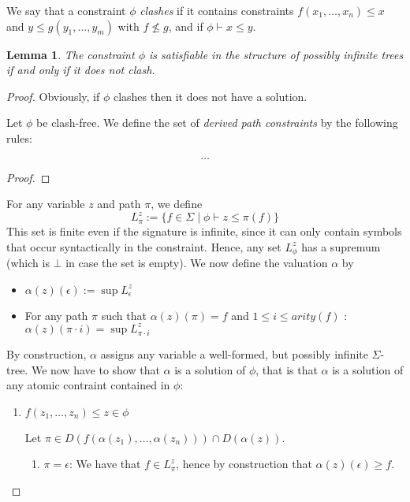\documentclass[11pt]{article}
\newtheorem{lemma}{Lemma}
\begin{document}
We say that a constraint $\phi$ \emph{clashes} if it contains
constraints $f(x_1,\ldots,x_n) \leq x$ and $y \leq g(y_1,\ldots,y_m)$
with $f \not\leq g$, and if $\phi \vdash x \leq y$.

\begin{lemma}
  The constraint $\phi$ is satisfiable in the structure of possibly
  infinite trees if and only if it does not clash.
\end{lemma}

\begin{proof}
  Obviously, if $\phi$ clashes then it does not have a solution.
  
  Let $\phi$ be clash-free. We define the set of \emph{derived path
    constraints} by the following rules:

\[\ldots \]

\begin{proof}

\end{proof}

For any variable $z$ and path $\pi$, we define 
\[
L^z_\pi  := \{f \in \Sigma \mid \phi \vdash z \leq \pi(f) \}
\]
This set is finite even if the signature is infinite, since it can
only contain symbols that occur syntactically in the constraint.
Hence, any set $L^z_\phi$ has a supremum (which is $\bot$ in case the
set is empty).  We now define the valuation $\alpha$ by
\begin{itemize}
\item $ \alpha(z)(\epsilon) := \sup L^z_\epsilon$
\item For any path $\pi$ such that $\alpha(z)(\pi)=f$ and $1 \leq i
  \leq arity(f)$ :\\ $\alpha(z)(\pi\cdot i) = \sup L^z_{\pi\cdot i}$
\end{itemize}
By construction, $\alpha$ assigns any variable a well-formed, but
possibly infinite $\Sigma$-tree. We now have to show that $\alpha$ is
a solution of $\phi$, that is that $\alpha$ is a solution of any
atomic contraint contained in $\phi$:
\begin{enumerate}
\item $f(z_1,\ldots,z_n) \leq z \in \phi$

Let $\pi \in D(f(\alpha(z_1),\ldots,\alpha(z_n))) \cap
D(\alpha(z))$.

\begin{enumerate}

\item $\pi=\epsilon$:
We have that $f\in L^z_\pi$, hence by construction that
$\alpha(z)(\epsilon) \geq f$.


\end{enumerate}
\end{enumerate}
\end{proof}
\end{document}
